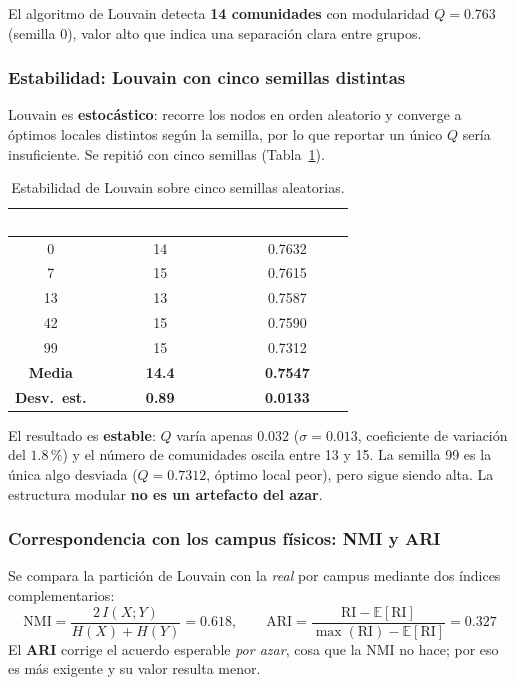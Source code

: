 \documentclass[11pt, a4paper]{article}
\newcommand{\encabezado}[1]{%
    \cellcolor{tabhead}\textcolor{white}{\textbf{#1}}}
\begin{document}
El algoritmo de Louvain detecta \textbf{14 comunidades} con modularidad
$Q = 0.763$ (semilla 0), valor alto que indica una separación clara entre
grupos.

\subsubsection*{Estabilidad: Louvain con cinco semillas distintas}

Louvain es \textbf{estocástico}: recorre los nodos en orden aleatorio y
converge a óptimos locales distintos según la semilla, por lo que reportar
un único $Q$ sería insuficiente. Se repitió con cinco semillas
(Tabla~\ref{tab:louvain_semillas}).

\begin{table}[htbp]
\centering
\caption{Estabilidad de Louvain sobre cinco semillas aleatorias.}
\label{tab:louvain_semillas}
\small
\begin{tabular}{c c c}
    \toprule
    \encabezado{Semilla} & \encabezado{N.º comunidades} &
    \encabezado{Modularidad $Q$} \\
    \midrule
    \rowcolor{tabfila}
    0  & 14 & 0.7632 \\
    7  & 15 & 0.7615 \\
    \rowcolor{tabfila}
    13 & 13 & 0.7587 \\
    42 & 15 & 0.7590 \\
    \rowcolor{tabfila}
    99 & 15 & 0.7312 \\
    \midrule
    \multicolumn{1}{c}{\textbf{Media}} & \textbf{14.4} & \textbf{0.7547} \\
    \multicolumn{1}{c}{\textbf{Desv.\ est.}} & \textbf{0.89} & \textbf{0.0133} \\
    \bottomrule
\end{tabular}
\end{table}

El resultado es \textbf{estable}: $Q$ varía apenas $0.032$
($\sigma = 0.013$, coeficiente de variación del $1.8\,\%$) y el número de
comunidades oscila entre 13 y 15. La semilla 99 es la única algo desviada
($Q=0.7312$, óptimo local peor), pero sigue siendo alta. La estructura
modular \textbf{no es un artefacto del azar}.

\subsubsection*{Correspondencia con los campus físicos: NMI y ARI}

Se compara la partición de Louvain con la \textit{real} por campus mediante
dos índices complementarios:
\[
  \text{NMI} = \frac{2\,I(X;Y)}{H(X)+H(Y)} = 0.618,
  \qquad
  \text{ARI} = \frac{\text{RI} - \mathbb{E}[\text{RI}]}
                    {\max(\text{RI}) - \mathbb{E}[\text{RI}]} = 0.327
\]
El \textbf{ARI} corrige el acuerdo esperable \textit{por azar}, cosa que la
NMI no hace; por eso es más exigente y su valor resulta menor.
\end{document}
